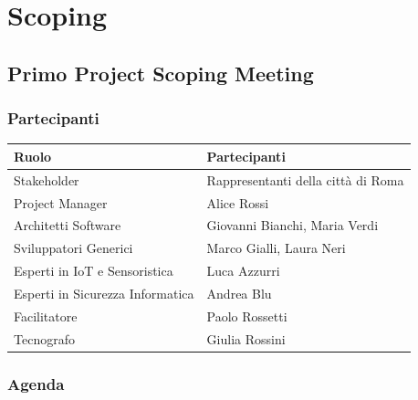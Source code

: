 \chapter{Scoping}

\section{Primo Project Scoping Meeting}

\subsection{Partecipanti}


\begin{center}
    \begin{tabular}{|l|l|}
        \hline
        \textbf{Ruolo}                   & \textbf{Partecipanti}              \\
        \hline
        Stakeholder                      & Rappresentanti della città di Roma \\
        \hline
        Project Manager                  & Alice Rossi                        \\
        \hline
        Architetti Software              & Giovanni Bianchi, Maria Verdi      \\
        \hline
        Sviluppatori Generici            & Marco Gialli, Laura Neri           \\
        \hline
        Esperti in IoT e Sensoristica    & Luca Azzurri                       \\
        \hline
        Esperti in Sicurezza Informatica & Andrea Blu                         \\
        \hline
        Facilitatore                     & Paolo Rossetti                     \\
        \hline
        Tecnografo                       & Giulia Rossini                     \\
        \hline
    \end{tabular}
\end{center}

\subsection{Agenda}

